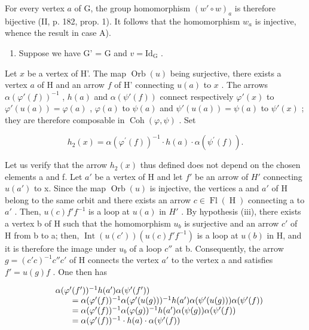 For every vertex \(a\) of G, the group homomorphism \((w' \circ w)_a\) is therefore bijective (II, p. 182, prop. 1). It follows that the homomorphism \(w_a\) is injective, whence the result in case A).

\begin{enumerate}
\def\labelenumi{\arabic{enumi})}
\setcounter{enumi}{1}
\tightlist
\item
  Suppose we have G' = G and \(v = \mathrm{Id}_{\mathrm{G}}\) .
\end{enumerate}

Let \(x\) be a vertex of H'. The map \(\operatorname{Orb}(u)\) being surjective, there exists a vertex \(a\) of H and an arrow \(f\) of H' connecting \(u(a)\) to \(x\) . The arrows \(\alpha(\varphi'(f))^{-1}\) , \(h(a)\) and \(\alpha(\psi'(f))\) connect respectively \(\varphi'(x)\) to \(\varphi'(u(a)) = \varphi(a)\) , \(\varphi(a)\) to \(\psi(a)\) and \(\psi'(u(a)) = \psi(a)\) to \(\psi'(x)\) ; they are therefore composable in \(\operatorname{Coh}(\varphi, \psi)\) . Set

\[
h _ {2} (x) = \alpha (\varphi^ {\prime} (f)) ^ {- 1} \cdot h (a) \cdot \alpha (\psi^ {\prime} (f)).
\]

Let us verify that the arrow \(h_{2}(x)\) thus defined does not depend on the chosen elements a and f. Let \(a'\) be a vertex of H and let \(f'\) be an arrow of \(H'\) connecting \(u(a')\) to x. Since the map \(\operatorname{Orb}(u)\) is injective, the vertices a and \(a'\) of H belong to the same orbit and there exists an arrow \(c \in \operatorname{Fl}(\operatorname{H})\) connecting a to \(a'\) . Then, \(u(c)f'f^{-1}\) is a loop at \(u(a)\) in \(H'\) . By hypothesis (iii), there exists a vertex b of H such that the homomorphism \(u_{b}\) is surjective and an arrow \(c'\) of H from b to a; then, \(\operatorname{Int}(u(c'))(u(c)f'f^{-1})\) is a loop at \(u(b)\) in H, and it is therefore the image under \(u_{b}\) of a loop \(c''\) at b. Consequently, the arrow \(g = (c'c)^{-1}c''c'\) of H connects the vertex \(a'\) to the vertex a and satisfies \(f' = u(g)f\) . One then has

\[
\begin{array}{r l} & {\alpha (\varphi^ {\prime} (f ^ {\prime})) ^ {- 1} h (a ^ {\prime}) \alpha (\psi^ {\prime} (f ^ {\prime}))} \\ & {\qquad = \alpha (\varphi^ {\prime} (f)) ^ {- 1} \alpha (\varphi^ {\prime} (u (g))) ^ {- 1} h (a ^ {\prime}) \alpha (\psi^ {\prime} (u (g))) \alpha (\psi^ {\prime} (f))} \\ & {\qquad = \alpha (\varphi^ {\prime} (f)) ^ {- 1} \alpha (\varphi (g)) ^ {- 1} h (a ^ {\prime}) \alpha (\psi (g)) \alpha (\psi^ {\prime} (f))} \\ & {\qquad = \alpha (\varphi^ {\prime} (f)) ^ {- 1} \cdot h (a) \cdot \alpha (\psi^ {\prime} (f))} \end{array}
\]

